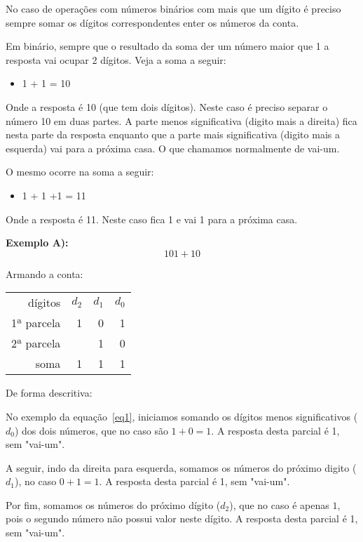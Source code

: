 No caso de operações com números binários com mais que um dígito é preciso sempre somar os dígitos correspondentes enter os números da conta.

Em binário, sempre que o resultado da soma der um número maior que 1 a resposta vai ocupar 2 dígitos. Veja a soma a seguir:
\begin{itemize}
	\item 1 + 1 = 10
\end{itemize}
Onde a resposta é 10 (que tem dois dígitos). Neste caso é preciso separar o número 10 em duas partes. 
A parte menos significativa (digito mais a direita) fica nesta parte da resposta enquanto que a parte mais significativa (digito mais a esquerda) vai para a próxima casa. O que chamamos normalmente de vai-um.

O mesmo ocorre na soma a seguir:
\begin{itemize}
	\item 1 + 1 +1 = 11
\end{itemize}
Onde a resposta é 11. Neste caso fica 1 e vai 1 para a próxima casa.


\textbf{Exemplo A):}
\begin{equation}\label{eq1}
101 + 10
\end{equation}

Armando a conta:
\begin{table}[h]
\centering
	\begin{tabular}{r|rrr}
		 	dígitos	& $d_2$ & $d_1$ & $d_0$ \\
		1ª parcela  & 1 & 0 & 1 \\
		2ª parcela  &   & 1 & 0 \\
		\hline
		   soma	  & 1 & 1 & 1 \\
	\end{tabular}
\end{table}

De forma descritiva:

No exemplo da equação~\ref{eq1}, iniciamos somando os dígitos menos significativos ($d_0$) dos dois números, que no caso são $ 1 + 0 = 1$. A resposta desta parcial é 1, sem "vai-um".

A seguir, indo da direita para esquerda, somamos os números do próximo digito ($d_1$), no caso $ 0 + 1 = 1$. A resposta desta parcial é 1, sem "vai-um".

Por fim, somamos os números do próximo dígito ($d_2$), que no caso é apenas $1$, pois o segundo número não possui valor neste dígito. A resposta desta parcial é 1, sem "vai-um".

